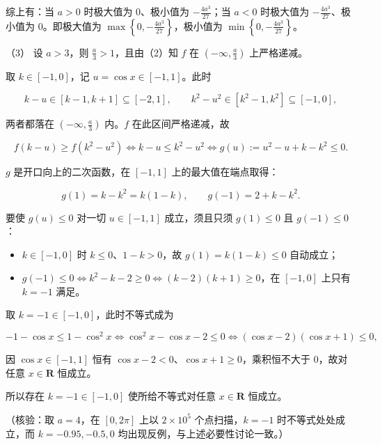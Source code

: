 \begin{answer}
综上有：当 $a>0$ 时极大值为 $0$、极小值为 $-\frac{4a^3}{27}$；当 $a<0$ 时极大值为 $-\frac{4a^3}{27}$、极小值为 $0$。即极大值为 $\max\left\{0,-\frac{4a^3}{27}\right\}$，极小值为 $\min\left\{0,-\frac{4a^3}{27}\right\}$。

（3） 设 $a>3$，则 $\frac a3>1$，且由（2）知 $f$ 在 $\left(-\infty,\frac a3\right)$ 上严格递减。

取 $k\in[-1,0]$，记 $u=\cos x\in[-1,1]$。此时

\nopagebreak[4]
\[k-u\in[k-1,k+1]\subseteq[-2,1],\qquad k^2-u^2\in\left[k^2-1,k^2\right]\subseteq[-1,0],\]

两者都落在 $\left(-\infty,\frac a3\right)$ 内。$f$ 在此区间严格递减，故

\nopagebreak[4]
\[f\left(k-u\right)\geqslant f\left(k^2-u^2\right)\iff k-u\leqslant k^2-u^2\iff g(u):=u^2-u+k-k^2\leqslant0 .\]

$g$ 是开口向上的二次函数，在 $[-1,1]$ 上的最大值在端点取得：

\nopagebreak[4]
\[g(1)=k-k^2=k(1-k),\qquad g(-1)=2+k-k^2 .\]

要使 $g(u)\leqslant0$ 对一切 $u\in[-1,1]$ 成立，须且只须 $g(1)\leqslant0$ 且 $g(-1)\leqslant0$：

\begin{itemize}
\item $k\in[-1,0]$ 时 $k\leqslant0$、$1-k>0$，故 $g(1)=k(1-k)\leqslant0$ 自动成立；
\item $g(-1)\leqslant0\iff k^2-k-2\geqslant0\iff(k-2)(k+1)\geqslant0$，在 $[-1,0]$ 上只有 $k=-1$ 满足。
\end{itemize}

取 $k=-1\in[-1,0]$，此时不等式成为

\nopagebreak[4]
\[-1-\cos x\leqslant1-\cos^2x\iff\cos^2x-\cos x-2\leqslant0\iff\left(\cos x-2\right)\left(\cos x+1\right)\leqslant0,\]

因 $\cos x\in[-1,1]$ 恒有 $\cos x-2<0$、$\cos x+1\geqslant0$，乘积恒不大于 $0$，故对任意 $x\in\mathbf R$ 恒成立。

所以存在 $k=-1\in[-1,0]$ 使所给不等式对任意 $x\in\mathbf R$ 恒成立。

（核验：取 $a=4$，在 $[0,2\pi]$ 上以 $2\times10^5$ 个点扫描，$k=-1$ 时不等式处处成立，而 $k=-0.95,-0.5,0$ 均出现反例，与上述必要性讨论一致。）


\end{answer}
